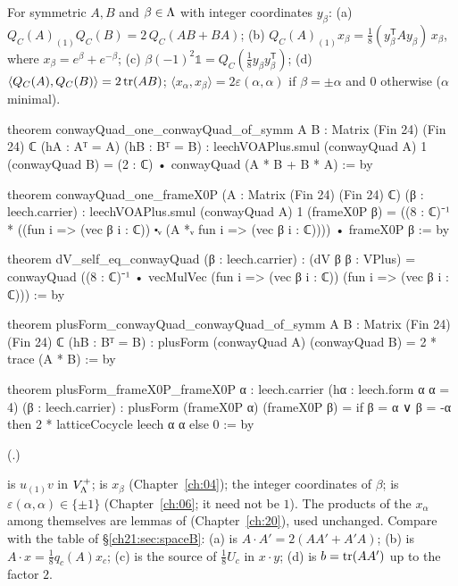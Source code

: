 \begin{theorem}\label{ch21:thm:conway}
For symmetric $A,B$ and $\beta\in{\Lambda}$ with integer coordinates $y_\beta$:
(a) $Q_C(A)_{(1)}Q_C(B)=2\,Q_C(AB+BA)$;
(b) $Q_C(A)_{(1)}x_\beta=\tfrac18(y_\beta^{\mathsf T}Ay_\beta)\,x_\beta$, where $x_\beta=e^\beta+e^{-\beta}$;
(c) $\beta(-1)^2\mathbb1=Q_C(\tfrac18y_\beta y_\beta^{\mathsf T})$;
(d) $\langle Q_C(A),Q_C(B)\rangle=2\operatorname{tr}(AB)$; $\langle x_\alpha,x_\beta\rangle=2\varepsilon(\alpha,\alpha)$ if
$\beta=\pm\alpha$ and $0$ otherwise ($\alpha$ minimal).
\end{theorem}
\begin{leancode}
theorem conwayQuad_one_conwayQuad_of_symm {A B : Matrix (Fin 24) (Fin 24) ℂ} (hA : Aᵀ = A)
    (hB : Bᵀ = B) :
    leechVOAPlus.smul (conwayQuad A) 1 (conwayQuad B) = (2 : ℂ) • conwayQuad (A * B + B * A) := by
\end{leancode}
\begin{leancode}
theorem conwayQuad_one_frameX0P (A : Matrix (Fin 24) (Fin 24) ℂ) (β : leech.carrier) :
    leechVOAPlus.smul (conwayQuad A) 1 (frameX0P β)
      = ((8 : ℂ)⁻¹ * ((fun i => (vec β i : ℂ)) ⬝ᵥ (A *ᵥ fun i => (vec β i : ℂ)))) • frameX0P β := by
\end{leancode}
\begin{leancode}
theorem dV_self_eq_conwayQuad (β : leech.carrier) :
    (dV β β : VPlus)
      = conwayQuad ((8 : ℂ)⁻¹ • vecMulVec (fun i => (vec β i : ℂ)) (fun i => (vec β i : ℂ))) := by
\end{leancode}
\begin{leancode}
theorem plusForm_conwayQuad_conwayQuad_of_symm {A B : Matrix (Fin 24) (Fin 24) ℂ}
    (hB : Bᵀ = B) : plusForm (conwayQuad A) (conwayQuad B) = 2 * trace (A * B) := by
\end{leancode}
\begin{leancode}
theorem plusForm_frameX0P_frameX0P {α : leech.carrier} (hα : leech.form α α = 4)
    (β : leech.carrier) :
    plusForm (frameX0P α) (frameX0P β)
      = if β = α ∨ β = -α then 2 * latticeCocycle leech α α else 0 := by
\end{leancode}
(.)
\begin{dictionary}
 is $u_{(1)}v$ in $V_{\Lambda}^+$;  is $x_\beta$
(Chapter~\ref{ch:04});  the integer coordinates of $\beta$; 
is $\varepsilon(\alpha,\alpha)\in\{\pm1\}$ (Chapter~\ref{ch:06}; it need not be $1$).  The products of the
$x_\alpha$ among themselves are lemmas of  (Chapter~\ref{ch:20}),
used unchanged.  Compare with the table of \S\ref{ch21:sec:spaceB}: (a) is $A\cdot A'=2(AA'+A'A)$; (b)
is $A\cdot x=\tfrac18q_c(A)x_c$; (c) is the source of $\tfrac18U_c$ in $x\cdot y$; (d) is $b=\operatorname{tr}(AA')$
up to the factor $2$.
\end{dictionary}
